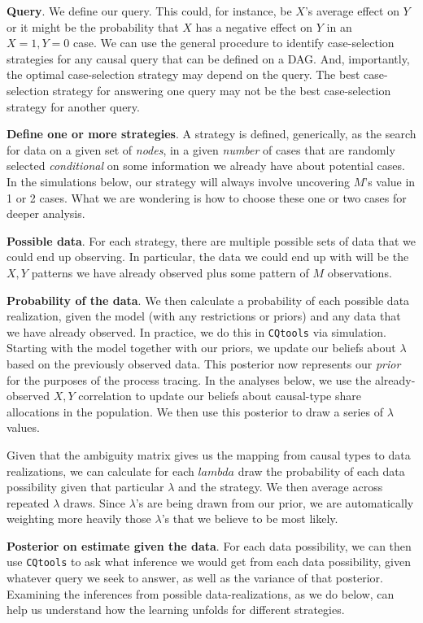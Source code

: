 \documentclass[
  12pt,
]{book}
\begin{document}
\textbf{Query}. We define our query. This could, for instance, be \(X\)'s average effect on \(Y\) or it might be the probability that \(X\) has a negative effect on \(Y\) in an \(X=1, Y=0\) case. We can use the general procedure to identify case-selection strategies for any causal query that can be defined on a DAG. And, importantly, the optimal case-selection strategy may depend on the query. The best case-selection strategy for answering one query may not be the best case-selection strategy for another query.

\textbf{Define one or more strategies}. A strategy is defined, generically, as the search for data on a given set of \emph{nodes}, in a given \emph{number} of cases that are randomly selected \emph{conditional} on some information we already have about potential cases. In the simulations below, our strategy will always involve uncovering \(M\)'s value in 1 or 2 cases. What we are wondering is how to choose these one or two cases for deeper analysis.

\textbf{Possible data}. For each strategy, there are multiple possible sets of data that we could end up observing. In particular, the data we could end up with will be the \(X,Y\) patterns we have already observed plus some pattern of \(M\) observations.

\textbf{Probability of the data}. We then calculate a probability of each possible data realization, given the model (with any restrictions or priors) and any data that we have already observed. In practice, we do this in \texttt{CQtools} via simulation. Starting with the model together with our priors, we update our beliefs about \(\lambda\) based on the previously observed data. This posterior now represents our \emph{prior} for the purposes of the process tracing. In the analyses below, we use the already-observed \(X,Y\) correlation to update our beliefs about causal-type share allocations in the population. We then use this posterior to draw a series of \(\lambda\) values.

Given that the ambiguity matrix gives us the mapping from causal types to data realizations, we can calculate for each \(lambda\) draw the probability of each data possibility given that particular \(\lambda\) and the strategy. We then average across repeated \(\lambda\) draws. Since \(\lambda\)'s are being drawn from our prior, we are automatically weighting more heavily those \(\lambda\)'s that we believe to be most likely.

\textbf{Posterior on estimate given the data}. For each data possibility, we can then use \texttt{CQtools} to ask what inference we would get from each data possibility, given whatever query we seek to answer, as well as the variance of that posterior. Examining the inferences from possible data-realizations, as we do below, can help us understand how the learning unfolds for different strategies.
\end{document}
